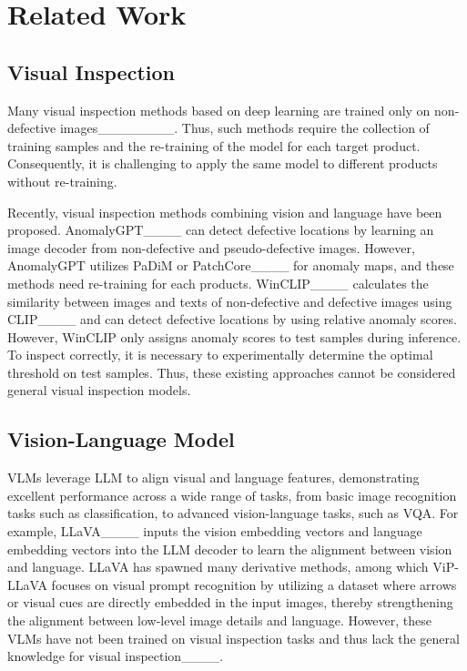 \section{Related Work}
\label{sec:relatedwork}

\subsection{Visual Inspection}
\label{sec:vi}
Many visual inspection methods based on deep learning are trained only on non-defective images________.
% 
Thus, such methods require the collection of training samples and the re-training of the model for each target product. 
% 
Consequently, it is challenging to apply the same model to different products without re-training.

Recently, visual inspection methods combining vision and language have been proposed.
% 
AnomalyGPT____ can detect defective locations by learning an image decoder from non-defective and pseudo-defective images. 
However, AnomalyGPT utilizes PaDiM or PatchCore____ for anomaly maps, and these methods need re-training for each products.
% 
WinCLIP____ calculates the similarity between images and texts of non-defective and defective images using CLIP____ and can detect defective locations by using relative anomaly scores.
% 
However, WinCLIP only assigns anomaly scores to test samples during inference. 
To inspect correctly, it is necessary to experimentally determine the optimal threshold on test samples.
Thus, these existing approaches cannot be considered general visual inspection models.



\subsection{Vision-Language Model}
\label{sec:VLM}
VLMs leverage LLM to align visual and language features, demonstrating excellent performance across a wide range of tasks, from basic image recognition tasks such as classification, to advanced vision-language tasks, such as VQA. 
% 
For example, LLaVA____ inputs the vision embedding vectors and language embedding vectors into the LLM decoder to learn the alignment between vision and language.
% 
LLaVA has spawned many derivative methods, among which ViP-LLaVA focuses on visual prompt recognition by utilizing a dataset where arrows or visual cues are directly embedded in the input images, thereby strengthening the alignment between low-level image details and language. 
% 
However, these VLMs have not been trained on visual inspection tasks and thus lack the general knowledge for visual inspection____.


